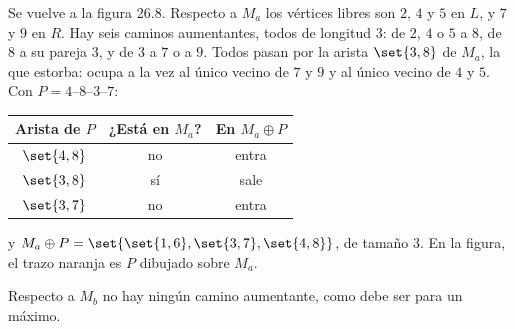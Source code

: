 \documentclass[11pt,letterpaper]{article}
\begin{document}
\begin{ejemplo}
  \label{ej:emparejamiento-aumento}
  Se vuelve a la figura 26.8. Respecto a $M_a$ los vértices libres
  son $2$, $4$ y $5$ en $L$, y $7$ y $9$ en $R$. Hay seis caminos
  aumentantes, todos de longitud $3$: de $2$, $4$ o $5$ a $8$, de $8$
  a su pareja $3$, y de $3$ a $7$ o a $9$. Todos pasan por la arista
  $\set{3,8}$ de $M_a$, la que estorba: ocupa a la vez al único
  vecino de $7$ y $9$ y al único vecino de $4$ y $5$. Con
  $P = 4$--$8$--$3$--$7$:
  \begin{center}
  \small
  \begin{tabular}{ccc}
    \toprule
    \textbf{Arista de $P$} & \textbf{¿Está en $M_a$?}
      & \textbf{En $M_a \oplus P$} \\
    \midrule
    $\set{4,8}$ & no & entra \\
    $\set{3,8}$ & sí & sale \\
    $\set{3,7}$ & no & entra \\
    \bottomrule
  \end{tabular}
  \end{center}
  y $M_a \oplus P = \set{\set{1,6}, \set{3,7}, \set{4,8}}$, de tamaño
  $3$. En la figura, el trazo naranja es $P$ dibujado sobre $M_a$.
  \begin{center}
  \end{center}
  Respecto a $M_b$ no hay ningún camino aumentante, como debe ser
  para un máximo.
\end{ejemplo}
\end{document}

